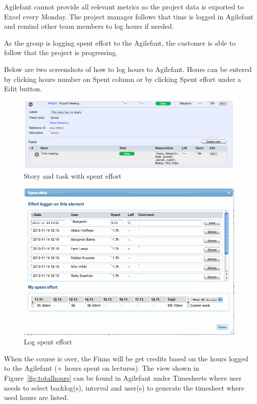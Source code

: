 Agilefant cannot provide all relevant metrics so the project data is exported to
Excel every Monday. The project manager follows that time is logged in
Agilefant and remind other team members to log hours if needed.

As the group is logging spent effort to the Agilefant, the customer is able to
follow that the project is progressing.

Below are two screenshots of how to log hours to Agilefant. Hours can be entered
by clicking hours number on Spent column or by clicking Spent effort under a
Edit button.

\begin{figure}[H]
\centering
\includegraphics[width=1\textwidth]{imgs/spenteffort1.png}
\caption{Story and task with spent effort}
\label{fig:spenteffort1}
\end{figure}


\begin{figure}[H]
\centering
\includegraphics[width=1\textwidth]{imgs/spenteffort2.png}
\caption{Log spent effort}
\label{fig:spenteffort2}
\end{figure}

When the course is over, the Finns will be get credits based on
the hours logged to the Agilefant (+ hours spent on lectures). The view shown in 
Figure~\ref{fig:totalhours} can be found in Agilefant under Timesheets where
user needs to select backlog(s), interval and user(s) to generate the timesheet where used 
hours are listed.

